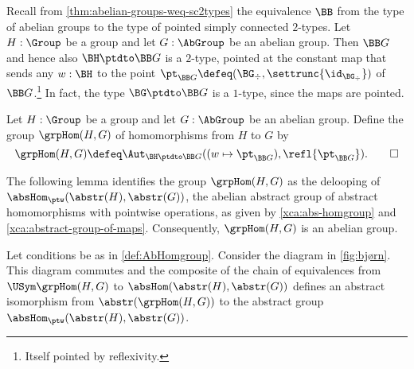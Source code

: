 Recall from \cref{thm:abelian-groups-weq-sc2types} the equivalence
$\BB$ from the type of abelian groups to the type of pointed
simply connected $2$-types. Let $H:\Group$ be a group and let
$G:\AbGroup$ be an abelian group.
Then $\BB G$ and hence also $\BH\ptdto\BB G$ is a $2$-type, 
pointed at the constant map that sends any $w:\BH$ to the 
point $\pt_{\BB G}\defeq (\BG_\div,\settrunc{\id_{\BG_\div}})$ 
of $\BB G$.\footnote{Itself pointed by reflexivity.} In fact,
the type $\BG\ptdto\BB G$ is a $1$-type, since the maps are pointed.

\begin{definition}\label{def:AbHomgroup}
Let $H:\Group$ be a group and let $G:\AbGroup$ be an abelian group. 
Define the group $\grpHom(H,G)$ of homomorphisms from $H$ to $G$ by 
\[
\grpHom(H,G) \defeq \Aut_{\BH\ptdto\BB G}
((w \mapsto \pt_{\BB G}),\refl{\pt_{\BB G}}).\qedhere
\]
\end{definition}

The following lemma identifies the group $\grpHom(H,G)$ as the 
delooping of $\absHom_{\ptw}(\abstr(H),\abstr(G))$, 
the abelian abstract group of abstract homomorphisms with
pointwise operations, as given by
\cref{xca:abs-homgroup} and \cref{xca:abstract-group-of-maps}.
Consequently, $\grpHom(H,G)$ is an abelian group.


\begin{lemma}\label{lem:grpHomOK}
Let conditions be as in \cref{def:AbHomgroup}. %
Consider the diagram in \cref{fig:bjørn}. This diagram commutes and
the composite of the chain of equivalences 
from $\USym\grpHom(H,G)$ to $\absHom(\abstr(H),\abstr(G))$
defines an abstract isomorphism from $\abstr(\grpHom(H,G))$ 
to the abstract group $\absHom_{\ptw}(\abstr(H),\abstr(G))$.
\end{lemma}

